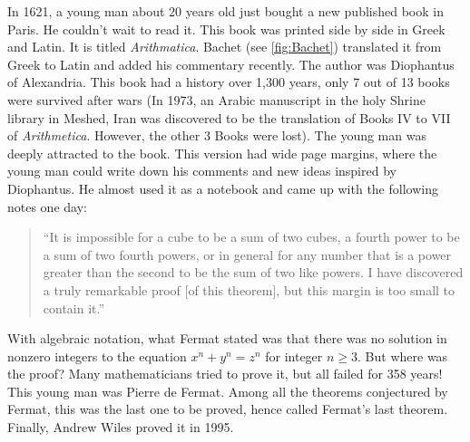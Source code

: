 \documentclass[b5paper]{article}
\begin{document}
\begin{mdframed}

In 1621, a young man about 20 years old just bought a new published book in Paris. He couldn't wait to read it. This book was printed side by side in Greek and Latin. It is titled \emph{Arithmatica}. Bachet (see \cref{fig:Bachet}) translated it from Greek to Latin and added his commentary recently. The author was Diophantus of Alexandria. This book had a history over 1,300 years, only 7 out of 13 books were survived after wars (In 1973, an Arabic manuscript in the holy Shrine library in Meshed, Iran was discovered to be the translation of Books IV to VII of \emph{Arithmetica}. However, the other 3 Books were lost). The young man was deeply attracted to the book. This version had wide page margins, where the young man could write down his comments and new ideas inspired by Diophantus. He almost used it as a notebook and came up with the following notes one day:

\begin{quotation} 
\enquote{It is impossible for a cube to be a sum of two cubes, a fourth power to be a sum of two fourth powers, or in general for any number that is a power greater than the second to be the sum of two like powers. I have discovered a truly remarkable proof [of this theorem], but this margin is too small to contain it.}
\end{quotation}

With algebraic notation, what Fermat stated was that there was no solution in nonzero integers to the equation $x^n + y^n = z^n$ for integer $n \geq 3$. But where was the proof? Many mathematicians tried to prove it, but all failed for 358 years! This young man was Pierre de Fermat. Among all the theorems conjectured by Fermat, this was the last one to be proved, hence called Fermat's last theorem. Finally, Andrew Wiles proved it in 1995.


\end{mdframed}
\end{document}

